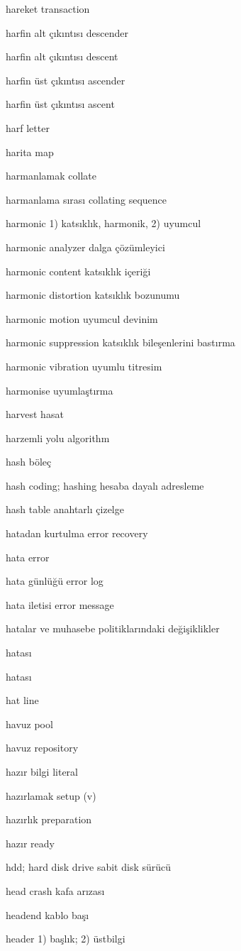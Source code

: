 \documentclass[12pt,fleqn]{article}\usepackage{../../common}
\begin{document}
hareket transaction

harfin alt çıkıntısı descender

harfin alt çıkıntısı descent

harfin üst çıkıntısı ascender

harfin üst çıkıntısı ascent

harf letter

harita map

harmanlamak collate

harmanlama sırası collating sequence

harmonic 1) katsıklık, harmonik, 2) uyumcul

harmonic analyzer dalga çözümleyici

harmonic content katsıklık içeriği

harmonic distortion katsıklık bozunumu

harmonic motion uyumcul devinim

harmonic suppression katsıklık bileşenlerini bastırma

harmonic vibration uyumlu titresim

harmonise uyumlaştırma

harvest hasat

harzemli yolu algorithm

hash böleç

hash coding; hashing hesaba dayalı adresleme

hash table anahtarlı çizelge

hatadan kurtulma error recovery

hata error

hata günlüğü error log

hata iletisi error message

hatalar ve muhasebe politiklarındaki değişiklikler

hatası

hatası

hat line

havuz pool

havuz repository

hazır bilgi literal

hazırlamak setup (v)

hazırlık preparation

hazır ready

hdd; hard disk drive sabit disk sürücü

head crash kafa arızası

headend kablo başı

header 1) başlık; 2) üstbilgi
\end{document}
